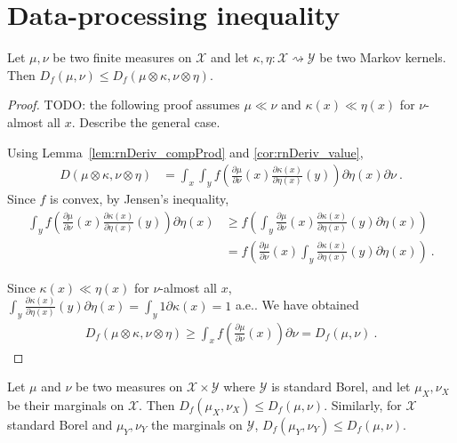 \section{Data-processing inequality}

\begin{theorem}
  \label{thm:fDiv_le_compProd}
  \leanok
  Let $\mu, \nu$ be two finite measures on $\mathcal X$ and let $\kappa, \eta : \mathcal X \rightsquigarrow \mathcal Y$ be two Markov kernels.
  Then $D_f(\mu, \nu) \le D_f(\mu \otimes \kappa, \nu \otimes \eta)$.
\end{theorem}

\begin{proof}\leanok
{}
TODO: the following proof assumes $\mu \ll \nu$ and $\kappa(x) \ll \eta(x)$ for $\nu$-almost all $x$. Describe the general case.

Using Lemma~\ref{lem:rnDeriv_compProd} and \ref{cor:rnDeriv_value},
\begin{align*}
D(\mu \otimes \kappa, \nu \otimes \eta)
&= \int_x \int_y f \left( \frac{\partial \mu}{\partial\nu}(x) \frac{\partial \kappa(x)}{\partial\eta(x)}(y) \right) \partial \eta(x) \partial \nu
\: .
\end{align*}
Since $f$ is convex, by Jensen's inequality,
\begin{align*}
\int_y f \left( \frac{\partial \mu}{\partial\nu}(x) \frac{\partial \kappa(x)}{\partial\eta(x)}(y) \right) \partial \eta(x)
&\ge f \left( \int_y \frac{\partial \mu}{\partial\nu}(x) \frac{\partial \kappa(x)}{\partial\eta(x)}(y) \partial \eta(x) \right)
\\
&= f \left( \frac{\partial \mu}{\partial\nu}(x) \int_y \frac{\partial \kappa(x)}{\partial\eta(x)}(y) \partial \eta(x) \right)
\: .
\end{align*}

Since $\kappa(x) \ll \eta(x)$ for $\nu$-almost all $x$, $\int_y \frac{\partial \kappa(x)}{\partial\eta(x)}(y) \partial \eta(x) = \int_y 1 \partial \kappa(x) = 1$ a.e.. We have obtained
\begin{align*}
D_f(\mu \otimes \kappa, \nu \otimes \eta)
\ge \int_x f \left( \frac{\partial \mu}{\partial\nu}(x)\right) \partial \nu
= D_f(\mu, \nu)
\: .
\end{align*}
\end{proof}

\begin{theorem}[Marginals]
  \label{thm:fDiv_fst_le}
  \leanok
  Let $\mu$ and $\nu$ be two measures on $\mathcal X \times \mathcal Y$ where $\mathcal Y$ is standard Borel, and let $\mu_X, \nu_X$ be their marginals on $\mathcal X$.
  Then $D_f(\mu_X, \nu_X) \le D_f(\mu, \nu)$.
  Similarly, for $\mathcal X$ standard Borel and $\mu_Y, \nu_Y$ the marginals on $\mathcal Y$, $D_f(\mu_Y, \nu_Y) \le D_f(\mu, \nu)$.
\end{theorem}

